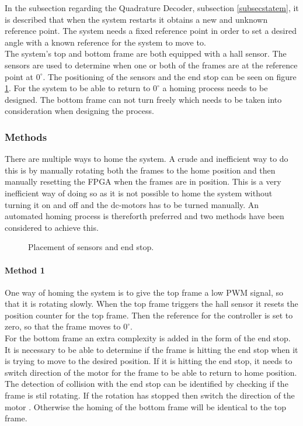 \documentclass[../../../main]{subfiles}
\begin{document}
In the subsection regarding the Quadrature Decoder, subsection \ref{subsecstatem},  it is described that when the system restarts it obtains a new and unknown reference point.
The system needs a fixed reference point in order to set a desired angle with a known reference for the system to move to.  \\
The system's top and bottom frame are both equipped with a hall sensor.
The sensors are used to determine when one or both of the frames are at the reference point at $0^\circ$. The positioning of the sensors and the end stop can be seen on figure \ref{fig:homing_system}.
For the system to be able to return to $0^\circ$ a homing process needs to be designed.
The bottom frame can not turn freely which needs to be taken into consideration when designing the process.
\subsubsection{Methods} 
There are multiple ways to home the system. A crude and inefficient way to do this is by manually rotating both the frames to the home position and then manually resetting the FPGA when the frames are in position.
This is a very inefficient way of doing so as it is not possible to home the system without turning it on and off and the dc-motors has to be turned manually.
An automated homing process is thereforth preferred and two methods have been considered to achieve this.

\begin{figure}[H]
  \centering
  \def\svgwidth{\textwidth}
  
  \caption{Placement of sensors and end stop.}
  \label{fig:homing_system}
\end{figure}

\paragraph{Method 1}%
\label{par:method_1}
One way of homing the system is to give the top frame a low PWM signal, so that it is rotating slowly.
When the top frame triggers the hall sensor it resets the position counter for the top frame.
Then the reference for the controller is set to zero, so that the frame moves to $0^\circ$. 
\\
For the bottom frame an extra complexity is added in the form of the end stop. It is necessary to be able to determine if the frame is hitting the end stop when it is trying to move to the desired position.
If it is hitting the end stop, it needs to switch direction of the motor for the frame to be able to return to home position.
The detection of collision with the end stop can be identified by checking if the frame is stil rotating. If the rotation has stopped then switch the direction of the motor .
Otherwise the homing of the bottom frame will be identical to the top frame.
\end{document}
